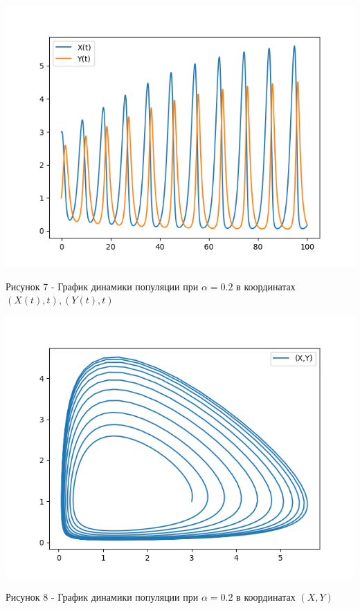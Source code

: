 \documentclass[a4paper,14pt]{extreport}
\begin{document}
\begin{center}
    \begin{minipage}[htb]{0.8\linewidth}
    \includegraphics[width=14cm]{n6.png}
    \end{minipage}
    \end{center}
    \begin{center}
        Рисунок 7 - График динамики популяции при $\alpha = 0.2$ в координатах $(X(t),t),(Y(t),t)$
    \end{center}
    \begin{center}
    \begin{minipage}[htb]{0.8\linewidth}
    \includegraphics[width=14cm]{6.png}
    \end{minipage}
    \end{center}
    \begin{center}
        Рисунок 8 - График динамики популяции при $\alpha = 0.2$ в координатах $(X,Y)$  
    \end{center}
\end{document}
